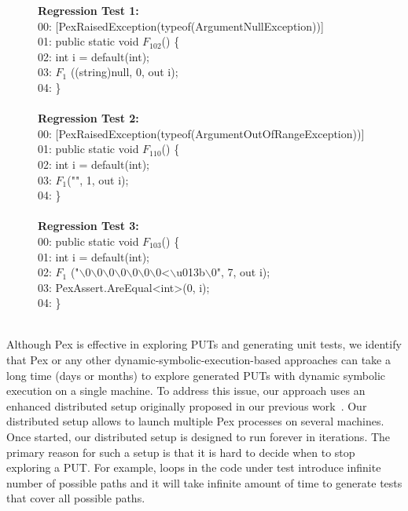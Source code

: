 \begin{figure}[t]
\begin{CodeOut}
\textbf{Regression Test 1:}\\
00: [PexRaisedException(typeof(ArgumentNullException))]\\
01: public static void $F_{102}$() \{\\
02: \hspace*{0.2in}int i = default(int); \\
03: \hspace*{0.2in}$F_1$ ((string)null, 0, out i);\\
04: \}\\
\\
\textbf{Regression Test 2:}\\
00: [PexRaisedException(typeof(ArgumentOutOfRangeException))]\\
01: public static void $F_{110}$() \{\\
02: \hspace*{0.2in}int i = default(int);\\
03: \hspace*{0.2in}$F_1$("", 1, out i);\\
04: \}\\
\\
\textbf{Regression Test 3:}\\
00: public static void $F_{103}$() \{\\
01: \hspace*{0.2in}int i = default(int);\\
02: \hspace*{0.2in}$F_1$ ("$\backslash$0$\backslash$0$\backslash$0$\backslash$0$\backslash$0$\backslash$0$\backslash$0<$\backslash$u013b$\backslash$0", 7, out i); \\
03: \hspace*{0.2in}PexAssert.AreEqual<int>(0, i);\\
04: \}\\
\\
\end{CodeOut}\vspace*{-5ex}
\vspace*{-1ex}
\end{figure}

Although Pex is effective in exploring PUTs and generating unit tests, we identify that Pex or any other dynamic-symbolic-execution-based approaches can take a long time (days or months) to explore generated PUTs with dynamic symbolic execution on a single machine. To address this issue, our approach uses an enhanced distributed setup originally proposed in our previous work~\cite{tillman:pexwhite}. Our distributed setup allows to launch multiple Pex processes on several machines. Once started, our distributed setup is designed to run forever in iterations. The primary reason for such a setup is that it is hard to decide when to stop exploring a PUT. For example, loops in the code under test introduce infinite number of possible paths and it will take infinite amount of time to generate tests that cover all possible paths.

